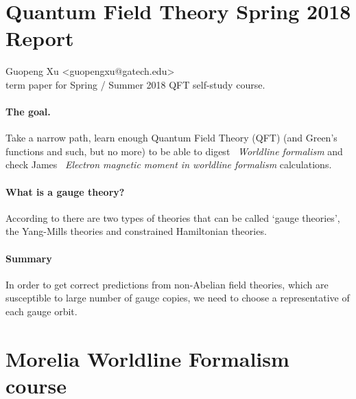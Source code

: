 
\section{Quantum Field Theory Spring 2018 Report}

\noindent
Guopeng Xu <guopengxu@gatech.edu> \\
term paper for Spring / Summer 2018 QFT self-study course.


\paragraph{The goal.}
    Take a narrow path, learn enough Quantum Field Theory (QFT) (and
    Green's functions and such, but no more) to be able to digest
    ~{\em Worldline formalism} and check James
    ~{\em Electron magnetic moment in
    worldline formalism} calculations.

 \paragraph{What is a gauge theory?}
According to there are two types of theories
that can be called \lq gauge theories\rq, the Yang-Mills theories and
constrained Hamiltonian theories.

\paragraph{Summary}
In order to get correct predictions from non-Abelian field theories,
which are susceptible to large number of gauge copies, we need to choose
a representative of each gauge orbit.

\section{Morelia Worldline Formalism course}
\label{c-MoreliaCourse}

